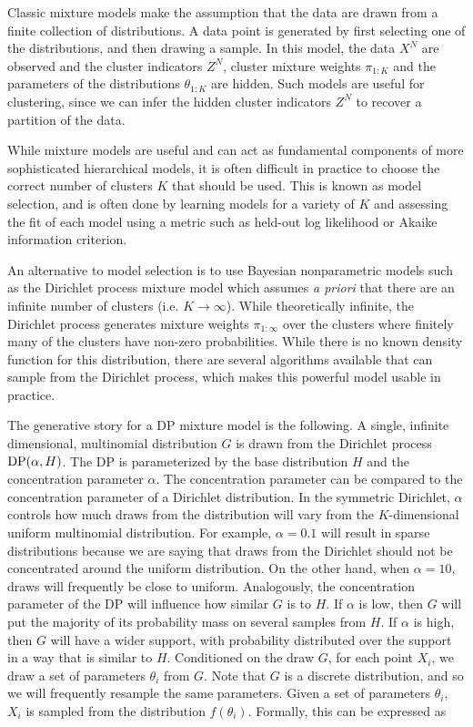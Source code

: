 Classic mixture models make the assumption that the data are drawn
from a finite collection of distributions. A data point is generated
by first selecting one of the distributions, and then drawing a
sample. In this model, the data $X^N$ are observed and the cluster
indicators $Z^N$, cluster mixture weights $\pi_{1:K}$ and the
parameters of the distributions $\theta_{1:K}$ are hidden. Such models
are useful for clustering, since we can infer the hidden cluster
indicators $Z^N$ to recover a partition of the data.

While mixture models are useful and can act as fundamental components
of more sophisticated hierarchical models, it is often difficult in
practice to choose the correct number of clusters $K$ that should be
used. This is known as model selection, and is often done by learning
models for a variety of $K$ and assessing the fit of each model using
a metric such as held-out log likelihood or Akaike information
criterion.

An alternative to model selection is to use Bayesian nonparametric
models such as the Dirichlet process mixture model \cite{antoniak1974}
which assumes \textit{a priori} that there are an infinite number of
clusters (i.e. $K \to \infty$). While theoretically infinite, the
Dirichlet process generates mixture weights $\pi_{1:\infty}$ over the
clusters where finitely many of the clusters have non-zero
probabilities. While there is no known density function for this
distribution, there are several algorithms available that can sample
from the Dirichlet process, which makes this powerful model usable in
practice.

The generative story for a DP mixture model is the following. A
single, infinite dimensional, multinomial distribution $G$ is drawn
from the Dirichlet process $\mathrm{DP}(\alpha, H)$. The DP is parameterized
by the base distribution $H$ and the concentration parameter
$\alpha$. The concentration parameter can be compared to the
concentration parameter of a Dirichlet distribution. In the symmetric
Dirichlet, $\alpha$ controls how much draws from the distribution will
vary from the $K$-dimensional uniform multinomial distribution. For
example, $\alpha = 0.1$ will result in sparse distributions because we
are saying that draws from the Dirichlet should not be concentrated
around the uniform distribution. On the other hand, when $\alpha =
10$, draws will frequently be close to uniform. Analogously, the
concentration parameter of the DP will influence how similar $G$ is to
$H$. If $\alpha$ is low, then $G$ will put the majority of its
probability mass on several samples from $H$. If $\alpha$ is high,
then $G$ will have a wider support, with probability distributed over
the support in a way that is similar to $H$. Conditioned on the draw
$G$, for each point $X_i$, we draw a set of parameters $\theta_i$ from
$G$. Note that $G$ is a discrete distribution, and so we will
frequently resample the same parameters. Given a set of parameters
$\theta_i$, $X_i$ is sampled from the distribution
$f(\theta_i)$. Formally, this can be expressed as

